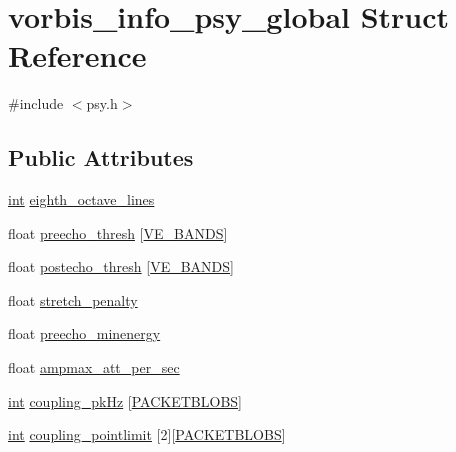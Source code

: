 \hypertarget{structvorbis__info__psy__global}{}\section{vorbis\+\_\+info\+\_\+psy\+\_\+global Struct Reference}
\label{structvorbis__info__psy__global}


{\ttfamily \#include $<$psy.\+h$>$}

\subsection*{Public Attributes}
\begin{DoxyCompactItemize}
\item 
\hyperlink{xmltok_8h_a5a0d4a5641ce434f1d23533f2b2e6653}{int} \hyperlink{structvorbis__info__psy__global_a88e8cf9fc8dd0de7562379558c4a1910}{eighth\+\_\+octave\+\_\+lines}
\item 
float \hyperlink{structvorbis__info__psy__global_a6c556b0f7a648c916c9ff2042d1e63ab}{preecho\+\_\+thresh} \mbox{[}\hyperlink{lib-src_2libvorbis_2lib_2_envelope_8h_a9309f3ce540b562a832e378b7f58d807}{V\+E\+\_\+\+B\+A\+N\+DS}\mbox{]}
\item 
float \hyperlink{structvorbis__info__psy__global_a9a413ec95a23be6ce0acb26684d1e13a}{postecho\+\_\+thresh} \mbox{[}\hyperlink{lib-src_2libvorbis_2lib_2_envelope_8h_a9309f3ce540b562a832e378b7f58d807}{V\+E\+\_\+\+B\+A\+N\+DS}\mbox{]}
\item 
float \hyperlink{structvorbis__info__psy__global_a18a1fc853e4c5a7fe425de4404a15637}{stretch\+\_\+penalty}
\item 
float \hyperlink{structvorbis__info__psy__global_a4b33ed2b895f683a5ed47ea81f65d7cf}{preecho\+\_\+minenergy}
\item 
float \hyperlink{structvorbis__info__psy__global_ad928858e7853b161d92c034fdf654265}{ampmax\+\_\+att\+\_\+per\+\_\+sec}
\item 
\hyperlink{xmltok_8h_a5a0d4a5641ce434f1d23533f2b2e6653}{int} \hyperlink{structvorbis__info__psy__global_a46c3c0ac9f76869103f947718087458b}{coupling\+\_\+pk\+Hz} \mbox{[}\hyperlink{codec__internal_8h_a9293c5a15a78abadbe212d944080e04b}{P\+A\+C\+K\+E\+T\+B\+L\+O\+BS}\mbox{]}
\item 
\hyperlink{xmltok_8h_a5a0d4a5641ce434f1d23533f2b2e6653}{int} \hyperlink{structvorbis__info__psy__global_a1f9a75e3bd47d5f025d89cd17c3100f2}{coupling\+\_\+pointlimit} \mbox{[}2\mbox{]}\mbox{[}\hyperlink{codec__internal_8h_a9293c5a15a78abadbe212d944080e04b}{P\+A\+C\+K\+E\+T\+B\+L\+O\+BS}\mbox{]}

\end{DoxyCompactItemize}
